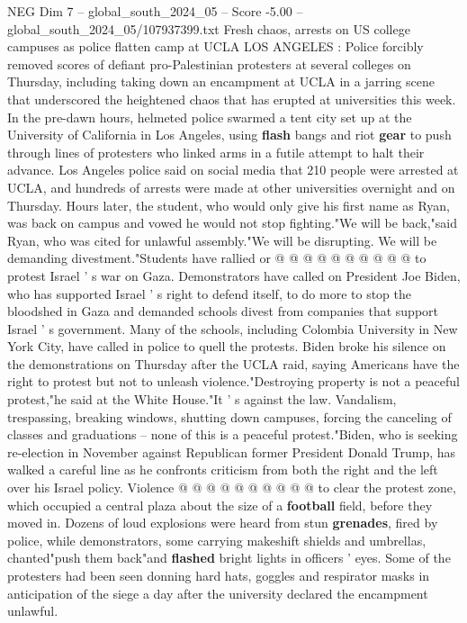 \begin{textsample}{NEG Dim 7 – global\_south\_2024\_05 – Score -5.00 – global\_south\_2024\_05/107937399.txt}  \label{ex:f7_neg_389}
Fresh chaos, arrests on US college campuses as police flatten camp at UCLA LOS ANGELES : Police forcibly removed scores of defiant pro-Palestinian protesters at several colleges on Thursday, including taking down an encampment at UCLA in a jarring scene that underscored the heightened chaos that has erupted at universities this week.
In the pre-dawn hours, helmeted police swarmed a tent city set up at the University of California in Los Angeles, using \textbf{flash} bangs and riot \textbf{gear} to push through lines of protesters who linked arms in a futile attempt to halt their advance.
Los Angeles police said on social media that 210 people were arrested at UCLA, and hundreds of arrests were made at other universities overnight and on Thursday.
Hours later, the student, who would only give his first name as Ryan, was back on campus and vowed he would not stop fighting."We will be back,"said Ryan, who was cited for unlawful assembly."We will be disrupting.
We will be demanding divestment."Students have rallied or @ @ @ @ @ @ @ @ @ @ to protest Israel ' s war on Gaza.
Demonstrators have called on President Joe Biden, who has supported Israel ' s right to defend itself, to do more to stop the bloodshed in Gaza and demanded schools divest from companies that support Israel ' s government.
Many of the schools, including Colombia University in New York City, have called in police to quell the protests.
Biden broke his silence on the demonstrations on Thursday after the UCLA raid, saying Americans have the right to protest but not to unleash violence."Destroying property is not a peaceful protest,"he said at the White House."It ' s against the law.
Vandalism, trespassing, breaking windows, shutting down campuses, forcing the canceling of classes and graduations -- none of this is a peaceful protest."Biden, who is seeking re-election in November against Republican former President Donald Trump, has walked a careful line as he confronts criticism from both the right and the left over his Israel policy.
Violence @ @ @ @ @ @ @ @ @ @ to clear the protest zone, which occupied a central plaza about the size of a \textbf{football} field, before they moved in.
Dozens of loud explosions were heard from stun \textbf{grenades}, fired by police, while demonstrators, some carrying makeshift shields and umbrellas, chanted"push them back"and \textbf{flashed} bright lights in officers ' eyes.
Some of the protesters had been seen donning hard hats, goggles and respirator masks in anticipation of the siege a day after the university declared the encampment unlawful.

\end{textsample}
